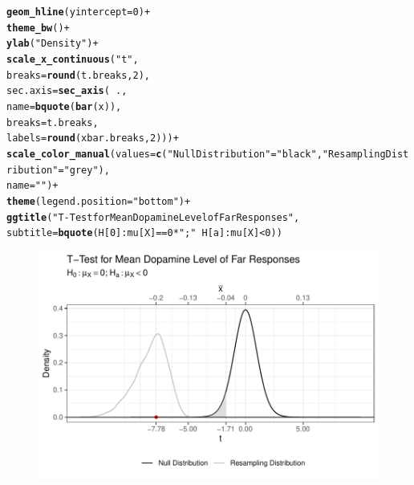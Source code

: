\documentclass{article}\usepackage[]{graphicx}\usepackage[]{xcolor}
\makeatletter
\def\maxwidth{ %
  \ifdim\Gin@nat@width>\linewidth
    \linewidth
  \else
    \Gin@nat@width
  \fi
}
\newcommand{\hlnum}[1]{\textcolor[rgb]{0.686,0.059,0.569}{#1}}%
\newcommand{\hlsng}[1]{\textcolor[rgb]{0.192,0.494,0.8}{#1}}%
\newcommand{\hlopt}[1]{\textcolor[rgb]{0,0,0}{#1}}%
\newcommand{\hldef}[1]{\textcolor[rgb]{0.345,0.345,0.345}{#1}}%
\newcommand{\hlkwc}[1]{\textcolor[rgb]{0.333,0.667,0.333}{#1}}%
\newcommand{\hlkwd}[1]{\textcolor[rgb]{0.737,0.353,0.396}{\textbf{#1}}}%
\newenvironment{kframe}{%
 \def\at@end@of@kframe{}%
 \ifinner\ifhmode%
  \def\at@end@of@kframe{\end{minipage}}%
  \begin{minipage}{\columnwidth}%
 \fi\fi%
 \def\FrameCommand##1{\hskip\@totalleftmargin \hskip-\fboxsep
 \colorbox{shadecolor}{##1}\hskip-\fboxsep
     \hskip-\linewidth \hskip-\@totalleftmargin \hskip\columnwidth}%
 \MakeFramed {\advance\hsize-\width
   \@totalleftmargin\z@ \linewidth\hsize
   \@setminipage}}%
 {\par\unskip\endMakeFramed%
 \at@end@of@kframe}
\newenvironment{knitrout}{}{} %
\makeatother
\begin{document}
\begin{enumerate}
\begin{enumerate}
\begin{knitrout}
\begin{kframe}
\begin{alltt}
\hlkwd{geom_hline}\hldef{(}\hlkwc{yintercept}\hldef{=}\hlnum{0}\hldef{)}\hlopt{+}
\hlkwd{theme_bw}\hldef{()}\hlopt{+}
\hlkwd{ylab}\hldef{(}\hlsng{"Density"}\hldef{)}\hlopt{+}
\hlkwd{scale_x_continuous}\hldef{(}\hlsng{"t"}\hldef{,}
                   \hlkwc{breaks} \hldef{=} \hlkwd{round}\hldef{(t.breaks,}\hlnum{2}\hldef{),}
                   \hlkwc{sec.axis} \hldef{=} \hlkwd{sec_axis}\hldef{(}\hlopt{~}\hldef{.,}
                                       \hlkwc{name} \hldef{=} \hlkwd{bquote}\hldef{(}\hlkwd{bar}\hldef{(x)),}
                                       \hlkwc{breaks} \hldef{= t.breaks,}
                                       \hlkwc{labels} \hldef{=} \hlkwd{round}\hldef{(xbar.breaks,}\hlnum{2}\hldef{)))}\hlopt{+}
\hlkwd{scale_color_manual}\hldef{(}\hlkwc{values} \hldef{=} \hlkwd{c}\hldef{(}\hlsng{"Null Distribution"} \hldef{=} \hlsng{"black"}\hldef{,} \hlsng{"Resampling Distribution"} \hldef{=} \hlsng{"grey"}\hldef{),}
                   \hlkwc{name} \hldef{=} \hlsng{""}\hldef{)} \hlopt{+}
\hlkwd{theme}\hldef{(}\hlkwc{legend.position} \hldef{=} \hlsng{"bottom"}\hldef{)}\hlopt{+}
\hlkwd{ggtitle}\hldef{(}\hlsng{"T-Test for Mean Dopamine Level of Far Responses"}\hldef{,}
        \hlkwc{subtitle}\hldef{=}\hlkwd{bquote}\hldef{(H[}\hlnum{0}\hldef{]}\hlopt{:} \hldef{mu[X]}\hlopt{==}\hlnum{0}\hlopt{*}\hlsng{";"}\hlopt{~}\hldef{H[a]}\hlopt{:} \hldef{mu[X]} \hlopt{<}\hlnum{0}\hldef{))}
\end{alltt}
\end{kframe}
\end{knitrout}
\begin{figure}[H]
\centering
\begin{knitrout}
\color{fgcolor}
\includegraphics[width=\maxwidth]{figure/unnamed-chunk-19-1} 

\end{knitrout}
\end{figure}
\end{enumerate}
\end{enumerate}
\end{document}
